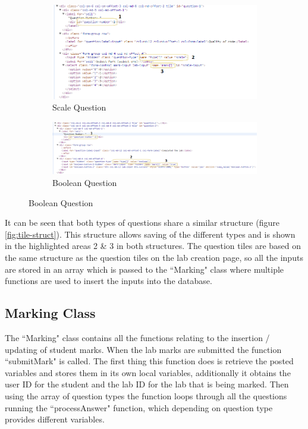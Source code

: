 \documentclass[11pt]{report}
\begin{document}
\begin{figure}[H]
\caption{HTML Structure Of Questions} \label{fig:tile-struct}
\centering
\begin{subfigure}[c]{0.45\textwidth}
    \includegraphics[width=1\textwidth]{images/implementation/question-structure-scale.png}
    \caption{Scale Question}
    \label{fig:struct-scale}
\end{subfigure}
\hfill
\begin{subfigure}[c]{0.45\textwidth}
    \includegraphics[width=1\textwidth]{images/implementation/question-structure-boolean.png}
    \caption{Boolean Question}
    \label{fig:struct-bool}
\end{subfigure}

\end{figure}

\noindent It can be seen that both types of questions share a similar structure (figure \ref{fig:tile-struct}). This structure allows saving of the different types and is shown in the highlighted areas 2 \& 3 in both structures. The question tiles are based on the same structure as the question tiles on the lab creation page, so all the inputs are stored in an array which is passed to the ``Marking" class where multiple functions are used to insert the inputs into the database.


\subsection*{Marking Class}

The ``Marking" class contains all the functions relating to the insertion / updating of student marks. When the lab marks are submitted the function ``submitMark" is called. The first thing this function does is retrieve the posted variables and stores them in its own local variables, additionally it obtains the user ID for the student and the lab ID for the lab that is being marked. Then using the array of question types the function loops through all the questions running the ``processAnswer" function, which depending on question type provides different variables.
\end{document}

